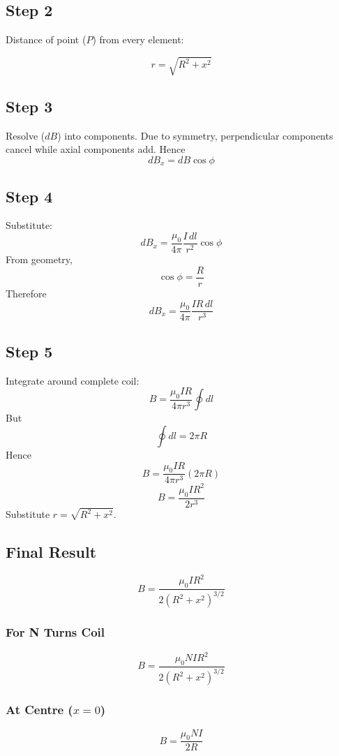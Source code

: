 \documentclass[11pt,a4paper]{article}
\begin{document}
\subsection*{Step 2}
Distance of point (\( P \)) from every element:
\begin{tcolorbox}[colback=RoyalBlue!5!white, colframe=RoyalBlue]
    \[ r = \sqrt{R^2+x^2} \]
\end{tcolorbox}

\subsection*{Step 3}
Resolve (\( dB \)) into components. Due to symmetry, perpendicular components cancel while axial components add.
Hence
\[ dB_x = dB \cos\phi \]

\subsection*{Step 4}
Substitute:
\[ dB_x = \frac{\mu_0}{4\pi} \frac{I \, dl}{r^2} \cos\phi \]
From geometry,
\[ \cos\phi = \frac{R}{r} \]
Therefore
\[ dB_x = \frac{\mu_0}{4\pi} \frac{I R \, dl}{r^3} \]

\subsection*{Step 5}
Integrate around complete coil:
\[ B = \frac{\mu_0 I R}{4\pi r^3} \oint dl \]
But
\[ \oint dl = 2\pi R \]
Hence
\[ B = \frac{\mu_0 I R}{4\pi r^3} (2\pi R) \]
\[ B = \frac{\mu_0 I R^2}{2r^3} \]
Substitute \( r = \sqrt{R^2+x^2} \).

\subsection*{Final Result}
\begin{tcolorbox}[colback=RoyalBlue!5!white, colframe=RoyalBlue]
    \[ B = \frac{\mu_0 I R^2}{2(R^2+x^2)^{3/2}} \]
\end{tcolorbox}

\subsubsection*{For N Turns Coil}
\begin{tcolorbox}[colback=RoyalBlue!5!white, colframe=RoyalBlue]
    \[ B = \frac{\mu_0 N I R^2}{2(R^2+x^2)^{3/2}} \]
\end{tcolorbox}

\subsubsection*{At Centre (\( x = 0 \))}
\begin{tcolorbox}[colback=RoyalBlue!5!white, colframe=RoyalBlue]
    \[ B = \frac{\mu_0 N I}{2R} \]
\end{tcolorbox}
\end{document}
